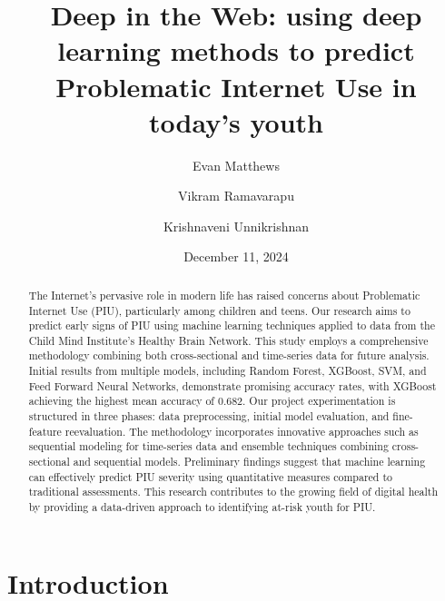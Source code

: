 \documentclass[12pt]{extarticle}
\title{Deep in the Web: using deep learning methods to predict Problematic Internet Use in today's youth}
\author[1]{Evan Matthews}
\author[1]{Vikram Ramavarapu}
\author[1]{Krishnaveni Unnikrishnan}
\affil[1]{CS 412 Group G6}
\date{December 11, 2024}
\begin{document}
\maketitle

\begin{abstract}
    The Internet's pervasive role in modern life has raised concerns about Problematic Internet Use (PIU), particularly among children and teens. 
    Our research aims to predict early signs of PIU using machine learning techniques applied to data from the Child Mind Institute's Healthy Brain Network. 
    This study employs a comprehensive methodology combining both cross-sectional and time-series data for future analysis. 
    Initial results from multiple models, including Random Forest, XGBoost, SVM, and Feed Forward Neural Networks, demonstrate promising accuracy rates, with XGBoost achieving the highest mean accuracy of 0.682. 
    Our project experimentation is structured in three phases: data preprocessing, initial model evaluation, and fine-feature reevaluation. 
    The methodology incorporates innovative approaches such as sequential modeling for time-series data and ensemble techniques combining cross-sectional and sequential models. 
    Preliminary findings suggest that machine learning can effectively predict PIU severity using quantitative measures compared to traditional assessments. 
    This research contributes to the growing field of digital health by providing a data-driven approach to identifying at-risk youth for PIU.
\end{abstract}
\pagebreak

\section{Introduction}
\end{document}
